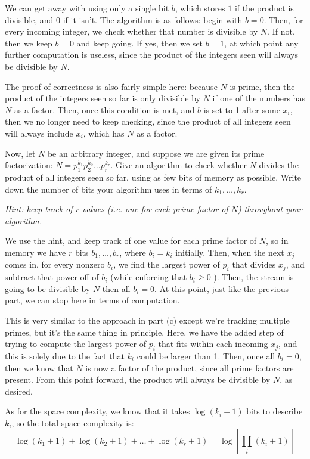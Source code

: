 \documentclass[11pt]{article}
\begin{document}
\begin{subparts}
\begin{solution}
	We can get away with using only a single bit \( b \), which stores \( 1 \) if the product is divisible, 
	and \( 0 \)
	if it isn't. The algorithm is as follows: begin with \( b =0 \). Then, for every 
	incoming integer, we check whether that number is divisible by \( N \). If not, then we keep \( b=0 \) and 
	keep going. If yes, then we set \( b = 1 \), at which point any further computation is useless, since 
	the product of the integers seen will always be divisible by \( N \). 

	The proof of correctness is also fairly simple here: because \( N \) is prime, then the product of the 
	integers seen so far is only divisible by \( N \) if one of the numbers has \( N \) as a factor. Then, 
	once this condition is met, and \( b \) is set to 1 after some \( x_i \), then we no longer need to keep 
	checking, since the product of all integers seen will always include \( x_i \), which has \( N \) as a
	factor.
\end{solution}

\subpart Now, let $N$ be an arbitrary integer, and suppose we are given its prime factorization: $N = p_1^{k_1}p_2^{k_2}\dots p_r^{k_r}$.
Give an algorithm to check whether $N$ divides the product of all integers seen so far, using as few bits of memory as possible.
Write down the number of bits your algorithm uses in terms of $k_{1},\ldots,k_{r}$.

\textit{Hint: keep track of $r$ values (i.e. one for each prime factor of $N$) throughout your algorithm.}

\begin{solution}
	We use the hint, and keep track of one value for each prime factor of \( N \), so in memory we have \( r \) 
	bits \( b_1, \dots, b_r \), where \( b_i = k_i \) initially. Then, when the next \( x_j \) comes in, for every
	nonzero \( b_i \), we find the largest power of \( p_i \) that divides \( x_j \), and subtract that power off
	of \( b_i \) (while enforcing that \( b_i \ge 0 \) ). Then, the stream is going to be divisible by \( N \)
	then all \( b_i = 0 \). At this point, just like the previous part, we can stop here in terms of computation.

	This is very similar to the approach in part (c) except we're tracking multiple primes, but it's the same thing in principle. 
	Here, we have the added step of trying to compute the largest power of \( p_i \) that fits within each incoming 
	\( x_j \), and this is solely due to the fact that \( k_i \) could be larger than 1. Then, once all \( b_i = 0 \), then we know 
	that \( N \) is now a factor of the product, since all prime factors are present. From this point forward, the product 
	will always be divisible by \( N \), as desired. 

	As for the space complexity, we know that it takes \( \log(k_i + 1) \) bits to describe \( k_i \), so the total space 
	complexity is:
	\[
	\log (k_1+1) + \log (k_2+1) + \dots + \log (k_r+1) = \log\left[ \prod_i (k_i +1) \right] 
	\] 
\end{solution}
\end{subparts}
\end{document}
